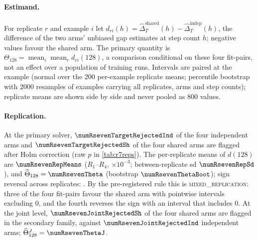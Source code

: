 \documentclass{article}
\theoremstyle{plain}
\theoremstyle{definition}
\theoremstyle{remark}
\begin{document}
\paragraph{Estimand.}
For replicate $r$ and example $i$ let $d_{ri}(h)=\widehat\Delta_T^{\text{shared}}(h)-\widehat\Delta_T^{\text{indep}}(h)$, the difference of the two arms' unbiased gap estimates at step count $h$; negative values favour the shared arm.
The primary quantity is $\Theta_{128}=\operatorname{mean}_i\operatorname{mean}_r d_{ri}(128)$, a comparison conditional on these four fit-pairs, not an effect over a population of training runs.
Intervals are paired at the example (normal over the $200$ per-example replicate means; percentile bootstrap with $2000$ resamples of examples carrying all replicates, arms and step counts); replicate means are shown side by side and never pooled as $800$ values.



\begin{table}[t]
\centering
\caption{Paired between-arm difference at the target level ($\times10^{3}$): per-replicate means $\bar d_r(h)$ with pointwise 95\% CIs, and $\widehat\Theta_h$ over examples (conditional on the four fits) with the example bootstrap; $h=256$ lies between the two columns (\cref{tab:r7thetafull}, appendix).}
\label{tab:r7theta}
\scriptsize
\setlength{\tabcolsep}{2pt}

\end{table}

\paragraph{Replication.}
At the primary solver, $\numRsevenTargetRejectedInd$ of the four independent arms and $\numRsevenTargetRejectedSh$ of the four shared arms are flagged after Holm correction (raw $p$ in \cref{tab:r7reps}).
The per-replicate means of $d(128)$ are $\numRsevenRepMeans$ ($R_1$--$R_4$, $\times10^{-3}$; between-replicate sd $\numRsevenRepSd$), and $\widehat\Theta_{128}=\numRsevenTheta$ (bootstrap $\numRsevenThetaBoot$); sign reversal across replicates: \numRsevenReversal.
By the pre-registered rule this is \textsc{mixed\_replication}: three of the four fit-pairs favour the shared arm with pointwise intervals excluding $0$, and the fourth reverses the sign with an interval that includes $0$.
At the joint level, $\numRsevenJointRejectedSh$ of the four shared arms are flagged in the secondary family, against $\numRsevenJointRejectedInd$ independent arms; $\widehat\Theta_{128}^{J}=\numRsevenThetaJ$.
\end{document}
